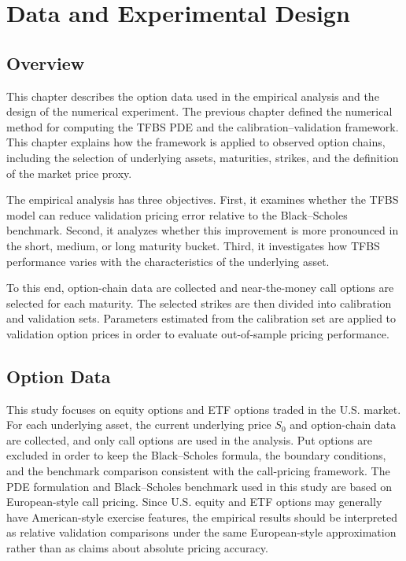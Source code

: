 \documentclass[11pt,a4paper]{report}
\begin{document}
\chapter{Data and Experimental Design}

\section{Overview}

This chapter describes the option data used in the empirical analysis and the design of the numerical experiment. The previous chapter defined the numerical method for computing the TFBS PDE and the calibration--validation framework. This chapter explains how the framework is applied to observed option chains, including the selection of underlying assets, maturities, strikes, and the definition of the market price proxy.

The empirical analysis has three objectives. First, it examines whether the TFBS model can reduce validation pricing error relative to the Black--Scholes benchmark. Second, it analyzes whether this improvement is more pronounced in the short, medium, or long maturity bucket. Third, it investigates how TFBS performance varies with the characteristics of the underlying asset.

To this end, option-chain data are collected and near-the-money call options are selected for each maturity. The selected strikes are then divided into calibration and validation sets. Parameters estimated from the calibration set are applied to validation option prices in order to evaluate out-of-sample pricing performance.

\section{Option Data}

This study focuses on equity options and ETF options traded in the U.S. market. For each underlying asset, the current underlying price $S_0$ and option-chain data are collected, and only call options are used in the analysis. Put options are excluded in order to keep the Black--Scholes formula, the boundary conditions, and the benchmark comparison consistent with the call-pricing framework. The PDE formulation and Black--Scholes benchmark used in this study are based on European-style call pricing. Since U.S. equity and ETF options may generally have American-style exercise features, the empirical results should be interpreted as relative validation comparisons under the same European-style approximation rather than as claims about absolute pricing accuracy.
\end{document}
